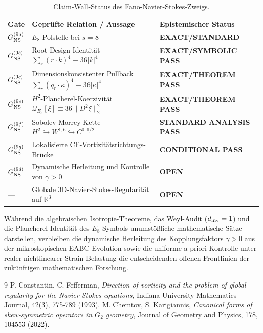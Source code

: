 \documentclass[11pt,twoside,a4paper]{article}
\begin{document}
	\begin{table}[htbp]
		\centering
		\caption{Claim-Wall-Status des Fano-Navier-Stokes-Zweigs.}
		\label{tab:claim_wall}
		\begin{tabular}{lll}
			\toprule
			Gate & Geprüfte Relation / Aussage & Epistemischer Status \\
			\midrule
			$G_{\rm NS}^{(9a)}$ & $E_8$-Polstelle bei $s=8$ & \textbf{EXACT/STANDARD} \\
			$G_{\rm NS}^{(9b)}$ & Root-Design-Identität $\sum_r (r \cdot k)^4 \equiv 36|k|^4$ & \textbf{EXACT/SYMBOLIC PASS} \\
			$G_{\rm NS}^{(9c)}$ & Dimensionskonsistenter Pullback $\sum_r (q_r \cdot \kappa)^4 \equiv 36|\kappa|^4$ & \textbf{EXACT/THEOREM PASS} \\
			$G_{\rm NS}^{(9e)}$ & $H^2$-Plancherel-Koerzivität $\mathcal{Q}_{E_8}[\xi] \equiv 36\|D^2\xi\|_2^2$ & \textbf{EXACT/THEOREM PASS} \\
			$G_{\rm NS}^{(9f)}$ & Sobolev-Morrey-Kette $H^2 \hookrightarrow W^{1,6} \hookrightarrow C^{0, 1/2}$ & \textbf{STANDARD ANALYSIS PASS} \\
			$G_{\rm NS}^{(9g)}$ & Lokalisierte CF-Vortizitätsrichtungs-Brücke & \textbf{CONDITIONAL PASS} \\
			$G_{\rm NS}^{(9d)}$ & Dynamische Herleitung und Kontrolle von $\gamma > 0$ & \textbf{OPEN} \\
			--- & Globale 3D-Navier-Stokes-Regularität auf $\mathbb{R}^3$ & \textbf{OPEN} \\
			\bottomrule
		\end{tabular}
	\end{table}
	
	Während die algebraischen Isotropie-Theoreme, das Weyl-Audit ($d_{\rm inv} = 1$) und die Plancherel-Identität des $E_8$-Symbols unumstößliche mathematische Sätze darstellen, verbleiben die dynamische Herleitung des Kopplungsfaktors $\gamma > 0$ aus der mikroskopischen EABC-Evolution sowie die uniforme a-priori-Kontrolle unter realer nichtlinearer Strain-Belastung die entscheidenden offenen Frontlinien der zukünftigen mathematischen Forschung.
	
	\begin{thebibliography}{9}
		 P. Constantin, C. Fefferman, \emph{Direction of vorticity and the problem of global regularity for the Navier-Stokes equations}, Indiana University Mathematics Journal, 42(3), 775-789 (1993).
		 M. Chemtov, S. Karigiannis, \emph{Canonical forms of skew-symmetric operators in $G_2$ geometry}, Journal of Geometry and Physics, 178, 104553 (2022).
	\end{thebibliography}
	
\end{document}
